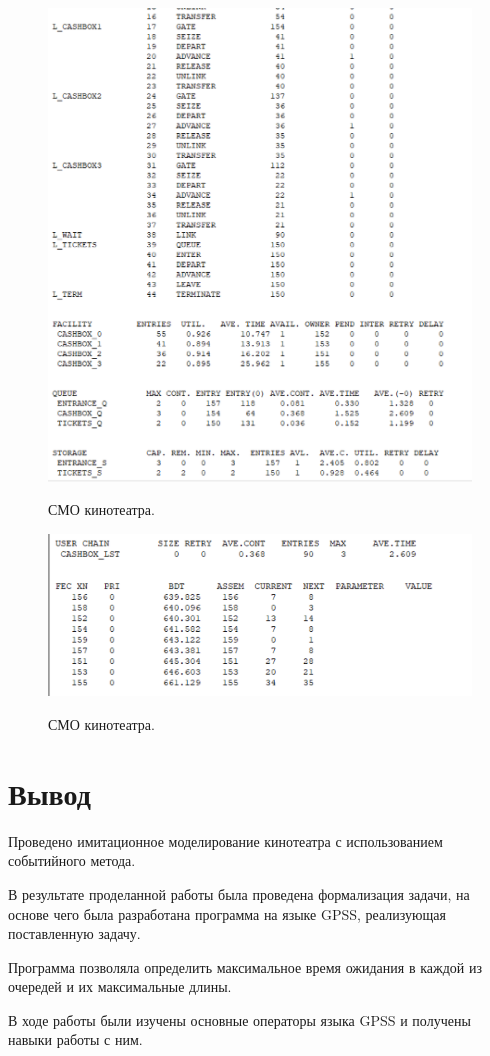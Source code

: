 \documentclass[a4paper,12pt]{article}
\begin{document}
	\begin{figure}[h!]
		\begin{center}
			{\includegraphics[scale = 0.6]{2.png}}
			\label{ris:smo2}
		\end{center}
		\caption{СМО кинотеатра.}
	\end{figure}

	\begin{figure}[h!]
		\begin{center}
			{\includegraphics[scale = 0.6]{3.png}}
			\label{ris:smo3}
		\end{center}
		\caption{СМО кинотеатра.}
	\end{figure}
	
	\section*{Вывод}
	
	Проведено имитационное моделирование кинотеатра с использованием событийного метода.
	
	В результате проделанной работы была проведена формализация задачи, на основе чего была разработана программа на языке GPSS, реализующая поставленную задачу.
	
	Программа позволяла определить максимальное время ожидания в каждой из очередей и их максимальные длины.
	
	В ходе работы были изучены основные операторы языка GPSS и получены
	навыки работы с ним.
	
\end{document}
